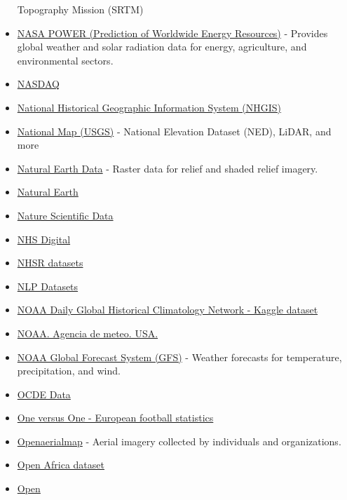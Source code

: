 \documentclass[
]{article}
\begin{document}
\begin{itemize}
  Topography Mission (SRTM)
\item
  \href{https://power.larc.nasa.gov/}{NASA POWER (Prediction of
  Worldwide Energy Resources)} - Provides global weather and solar
  radiation data for energy, agriculture, and environmental sectors.
\item
  \href{https://indexes.nasdaqomx.com/Index/History/NQASPA8600AUD}{NASDAQ}
\item
  \href{https://www.nhgis.org/}{National Historical Geographic
  Information System (NHGIS)}
\item
  \href{https://www.usgs.gov/programs/national-geospatial-program/national-map}{National
  Map (USGS)} - National Elevation Dataset (NED), LiDAR, and more
\item
  \href{https://www.naturalearthdata.com/downloads/}{Natural Earth Data}
  - Raster data for relief and shaded relief imagery.
\item
  \href{http://www.naturalearthdata.com/}{Natural Earth}
\item
  \href{https://www.nature.com/sdata/}{Nature Scientific Data}
\item
  \href{digital.nhs.uk/data-and-information/statistical-publications-open-data-and-data-products}{NHS
  Digital}
\item
  \href{https://github.com/nhs-r-community/NHSRdatasets}{NHSR datasets}
\item
  \href{https://github.com/niderhoff/nlp-datasets/blob/master/README.md}{NLP
  Datasets}
\item
  \href{https://www.kaggle.com/noaa/ghcn-d}{NOAA Daily Global Historical
  Climatology Network - Kaggle dataset}
\item
  \href{http://www.nesdis.noaa.gov/index.html}{NOAA. Agencia de meteo.
  USA.}
\item
  \href{https://www.ncei.noaa.gov/}{NOAA Global Forecast System (GFS)} -
  Weather forecasts for temperature, precipitation, and wind.
\item
  \href{https://www.oecd.org/en/data.html}{OCDE Data}
\item
  \href{https://one-versus-one.com/en}{One versus One - European
  football statistics}
\item
  \href{https://openaerialmap.org/}{Openaerialmap} - Aerial imagery
  collected by individuals and organizations.
\item
  \href{https://open.africa/dataset}{Open Africa dataset}
\item
  \href{https://opendatabarometer.org/?_year=2017&indicator=ODB}{Open
}
\end{itemize}
\end{document}
